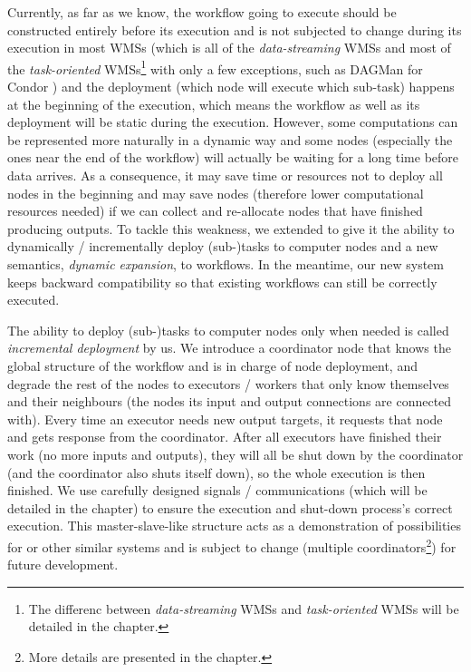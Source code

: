Currently, as far as we know, the workflow going to execute should be constructed entirely before its execution and is not subjected to change during its execution in most WMSs (which is all of the \emph{data-streaming} WMSs and most of the \emph{task-oriented} WMSs\footnote{The differenc between \emph{data-streaming} WMSs and \emph{task-oriented} WMSs will be detailed in the  chapter.} with only a few exceptions, such as DAGMan for Condor \cite{couvares2007workflow}) and the deployment (\ie which node will execute which sub-task) happens at the beginning of the execution, which means the workflow as well as its deployment will be static during the execution. However, some computations can be represented more naturally in a dynamic way and some nodes (especially the ones near the end of the workflow) will actually be waiting for a long time before data arrives. As a consequence, it may save time or resources not to deploy all nodes in the beginning and may save nodes (therefore lower computational resources needed) if we can collect and re-allocate nodes that have finished producing outputs. To tackle this weakness, we extended \dpy to give it the ability to dynamically / incrementally deploy (sub-)tasks to computer nodes and a new semantics, \emph{dynamic expansion}, to workflows. In the meantime, our new system keeps backward compatibility so that existing workflows can still be correctly executed.

The ability to deploy (sub-)tasks to computer nodes only when needed is called \emph{incremental deployment} by us. We introduce a coordinator node that knows the global structure of the workflow and is in charge of node deployment, and degrade the rest of the nodes to executors / workers that only know themselves and their neighbours (\ie the nodes its input and output connections are connected with). Every time an executor needs new output targets, it requests that node and gets response from the coordinator. After all executors have finished their work (\ie no more inputs and outputs), they will all be shut down by the coordinator (and the coordinator also shuts itself down), so the whole execution is then finished. We use carefully designed signals / communications (which will be detailed in the  chapter) to ensure the execution and shut-down process's correct execution. This master-slave-like structure acts as a demonstration of possibilities for \dpy or other similar systems and is subject to change (\eg multiple coordinators\footnote{More details are presented in the  chapter.}) for future development.

